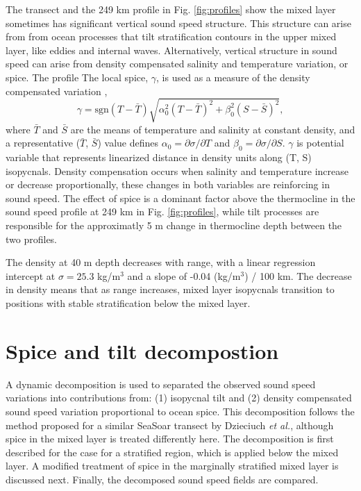 \documentclass[preprint,NumberedRefs]{JASA}
\begin{document}
The transect and the 249 km profile in Fig. \ref{fig:profiles} show the mixed layer sometimes has significant vertical sound speed structure. This structure can arise from from ocean processes that tilt stratification contours in the upper mixed layer, like eddies and internal waves. Alternatively, vertical structure in sound speed can arise from density compensated salinity and temperature variation, or spice. The profile The local spice, $\gamma$, is used as a measure of the density compensated variation \citep{klymak2015spice},
\begin{equation}
    \gamma=\textrm{sgn}(T-\bar{T}) \sqrt{\alpha_0^2(T-\bar{T})^2 +\beta_0^2(S-\bar{S})^2},
    \label{eq:gamma}
\end{equation}
where $\bar{T}$ and $\bar{S}$ are the means of temperature and salinity at constant density, and a representative ($\bar{T}$, $\bar{S}$) value defines $\alpha_0=\partial \sigma / \partial T$ and $\beta_0=\partial \sigma / \partial S$. $\gamma$ is potential variable that represents linearized distance in density units along (T, S) isopycnals. Density compensation occurs when salinity and temperature increase or decrease proportionally, these changes in both variables are reinforcing in sound speed. The effect of spice is a dominant factor above the thermocline in the sound speed profile at 249 km in Fig. \ref{fig:profiles}, while tilt processes are responsible for the approximatly 5 m change in thermocline depth between the two profiles.

The density at 40 m depth decreases with range, with a linear regression intercept at $\sigma=25.3$ kg/m$^3$ and a slope of -0.04 (kg/m$^3$) / 100 km. The decrease in density means that as range increases, mixed layer isopycnals transition to positions with stable stratification below the mixed layer.

\section{\label{sec:decomposition}Spice and tilt decompostion}
A dynamic decomposition is used to separated the observed sound speed variations into contributions from: (1) isopycnal tilt and (2) density compensated sound speed variation proportional to ocean spice. This decomposition follows the method proposed for a similar SeaSoar transect by Dzieciuch \emph{et al.}\citep{dzieciuch2004}, although spice in the mixed layer is treated differently here. The decomposition is first described for the case for a stratified region, which is applied below the mixed layer. A modified treatment of spice in the marginally stratified mixed layer is discussed next. Finally, the decomposed sound speed fields are compared.
\end{document}
